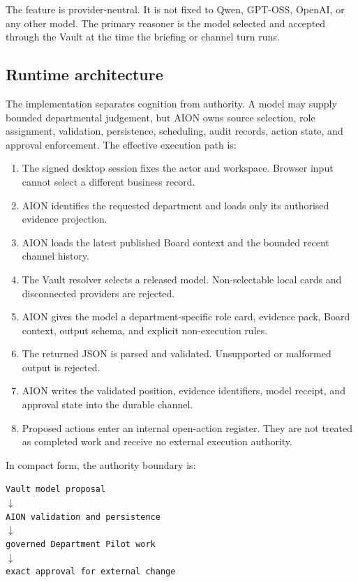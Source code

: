The feature is provider-neutral.  It is not fixed to Qwen, GPT-OSS, OpenAI, or any other model.
The primary reasoner is the model selected and accepted through the Vault at the time the briefing
or channel turn runs.

\subsection{Runtime architecture}

The implementation separates cognition from authority.  A model may supply bounded departmental
judgement, but AION owns source selection, role assignment, validation, persistence, scheduling,
audit records, action state, and approval enforcement.  The effective execution path is:

\begin{enumerate}[leftmargin=*]
\item The signed desktop session fixes the actor and workspace.  Browser input cannot select a
      different business record.
\item AION identifies the requested department and loads only its authorised evidence projection.
\item AION loads the latest published Board context and the bounded recent channel history.
\item The Vault resolver selects a released model.  Non-selectable local cards and disconnected
      providers are rejected.
\item AION gives the model a department-specific role card, evidence pack, Board context, output
      schema, and explicit non-execution rules.
\item The returned JSON is parsed and validated.  Unsupported or malformed output is rejected.
\item AION writes the validated position, evidence identifiers, model receipt, and approval state
      into the durable channel.
\item Proposed actions enter an internal open-action register.  They are not treated as completed
      work and receive no external execution authority.
\end{enumerate}

In compact form, the authority boundary is:
\begin{center}
\texttt{Vault model proposal}\\
$\downarrow$\\
\texttt{AION validation and persistence}\\
$\downarrow$\\
\texttt{governed Department Pilot work}\\
$\downarrow$\\
\texttt{exact approval for external change}
\end{center}

